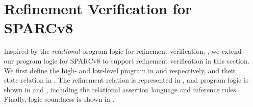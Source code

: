 \section{Refinement Verification for SPARCv8}
\label{sec:refine-verification-sparc}

Inspired by the {\it relational} program logic for 
refinement verification, , 
we extend our program logic for SPARCv8 to support
refinement verification in this section. 
We first define the high- and low-level program in 
\Sec{\ref{subsec:High-level Pseudo-SPARCv8 Language}} and 
\Sec{\ref{subsec:low-level SPARCv8 Program}} respectively, 
and their state relation in \Sec{\ref{subsec:state-rel}}. 
The refinement relation is represented in 
\Sec{\ref{subsec:correctness-primitive}}, 
and program logic is shown in 
\Sec{\ref{subsec:rel-assertion}} and 
\Sec{\ref{subsec:logic-rule-refinemet}}, 
including the relational assertion language 
and inference rules.  
Finally, logic soundness is shown in 
\Sec{\ref{subsec:logic-ensuring-ctxrefinement}}.


